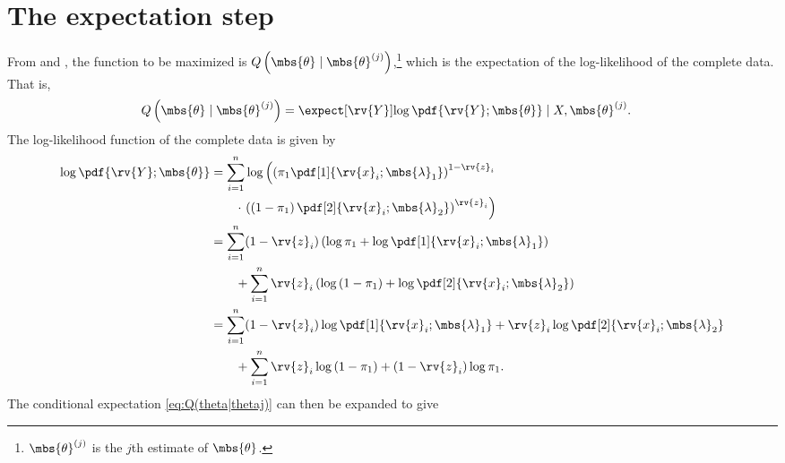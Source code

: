 \documentclass{tufte-handout}
\begin{document}
    \section{The expectation step}
    From \cite{hastie_elements_2009} and \cite{wasserman_all_2004}, the function to be maximized is $Q\left(\mbs{\theta}\mid\mbs{\theta}^{(j)}\right)$,\footnote{$\mbs{\theta}^{(j)}$ is the $j$th estimate of $\mbs{\theta}$.} which is the expectation of the log-likelihood of the complete data. That is,
    \begin{align}
        \label{eq:Q(theta|thetaj)}
        Q\left(\mbs{\theta}\mid\mbs{\theta}^{(j)}\right) &= \expect[\rv{Y}]{\log \pdf{\rv{Y} ; \mbs{\theta}} \mid X, \mbs{\theta}^{(j)}}.
    \end{align}
    The log-likelihood function of the complete data is given by
    \begin{align}
        \log \pdf{\rv{Y} ; \mbs{\theta}} 
        &=
        \sum_{i=1}^{n}
        \log \left( \left(\pi_{1}\pdf[1]{\rv{x}_{i}; \mbs{\lambda}_{1}}\right)^{1-\rv{z}_{i}} \right.\nonumber\\&\qquad\cdot\left.\left( \left(1-\pi_{1}\right)\pdf[2]{\rv{x}_{i}; \mbs{\lambda}_{2}} \right)^{\rv{z}_{i}} \right) \\
        &=
        \sum_{i=1}^{n} (1-\rv{z}_{i})\left( \log \pi_{1}+ \log \pdf[1]{\rv{x}_{i}; \mbs{\lambda}_{1}} \right)\nonumber\\&\qquad
        +\sum_{i=1}^{n}\rv{z}_{i}\left(\log\left( 1-\pi_{1} \right)  + \log\pdf[2]{\rv{x}_{i}; \mbs{\lambda}_{2}}\right)\\
        &=
        \sum_{i=1}^{n} (1-\rv{z}_{i}) \log \pdf[1]{\rv{x}_{i}; \mbs{\lambda}_{1}} + \rv{z}_{i}\log\pdf[2]{\rv{x}_{i}; \mbs{\lambda}_{2}}
        \nonumber\\&\qquad
        +\sum_{i=1}^{n}\rv{z}_{i}\log\left( 1-\pi_{1} \right) + (1-\rv{z}_{i})\log \pi_{1}.
    \end{align}
    The conditional expectation \eqref{eq:Q(theta|thetaj)} can then be expanded to give
\end{document}
